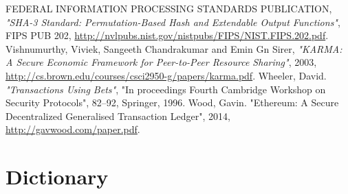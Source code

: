 \documentclass[a4paper]{article}
\begin{document}
\begin{thebibliography}{9}
 FEDERAL INFORMATION PROCESSING STANDARDS PUBLICATION,
    \textit{"SHA-3 Standard: Permutation-Based Hash and Extendable Output Functions"}, FIPS PUB 202,
    \url{http://nvlpubs.nist.gov/nistpubs/FIPS/NIST.FIPS.202.pdf}.
 Vishnumurthy, Viviek, Sangeeth Chandrakumar and Emin Gn Sirer, \textit{"KARMA: A Secure
    Economic Framework for Peer-to-Peer Resource Sharing"}, 2003,
   \url{http://cs.brown.edu/courses/csci2950-g/papers/karma.pdf}.
 Wheeler, David. \textit{"Transactions Using Bets"},
    "In proceedings Fourth Cambridge Workshop on Security Protocols", 82--92, Springer, 1996.
 Wood, Gavin. "Ethereum: A Secure Decentralized Generalised Transaction Ledger", 2014,
    \url{http://gavwood.com/paper.pdf}.
\end{thebibliography}
\appendix
\section{Dictionary}
\end{document}
